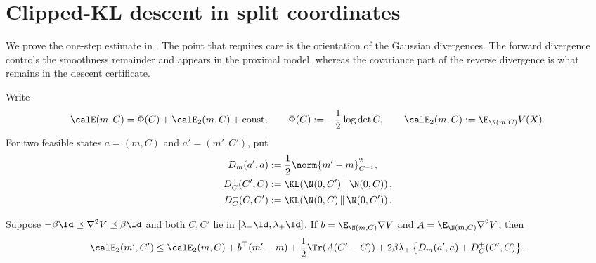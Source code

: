 \section{Clipped-KL descent in split coordinates}
\label{app:nonconvex-details}

We prove the one-step estimate in
.  The point that requires care is
the orientation of the Gaussian divergences.  The forward divergence controls
the smoothness remainder and appears in the proximal model, whereas the
covariance part of the reverse divergence is what remains in the descent
certificate.

Write
\[
  \calE(m,C)=\Phi(C)+\calE_2(m,C)+\mathrm{const},
  \qquad
  \Phi(C):=-\frac12\log\det C,
  \qquad
  \calE_2(m,C):=\E_{\N(m,C)}V(X).
\]
For two feasible states \(a=(m,C)\) and \(a'=(m',C')\), put
\begin{align*}
  D_m(a',a)
  &:=\frac12\norm{m'-m}_{C^{-1}}^2,\\
  D_C^+(C',C)
  &:=\KL\!\left(\N(0,C')\,\middle\|\,\N(0,C)\right),\\
  D_C^-(C,C')
  &:=\KL\!\left(\N(0,C)\,\middle\|\,\N(0,C')\right).
\end{align*}

\begin{lemma}
\label{lem:app:nonconvex-relative-smoothness}
Suppose
\(-\beta\Id\preceq\nabla^2V\preceq\beta\Id\) and both \(C,C'\) lie in
\([\lambda_-\Id,\lambda_+\Id]\).  If
\(b=\E_{\N(m,C)}\nabla V\) and
\(A=\E_{\N(m,C)}\nabla^2V\), then
\begin{equation}
  \calE_2(m',C')
  \leq
  \calE_2(m,C)
  +b^\top(m'-m)+\frac12\Tr\!\left(A(C'-C)\right)
  +2\beta\lambda_+
   \left\{D_m(a',a)+D_C^+(C',C)\right\}.
  \label{eq:app:nonconvex-relative-smoothness}
\end{equation}
\end{lemma}

